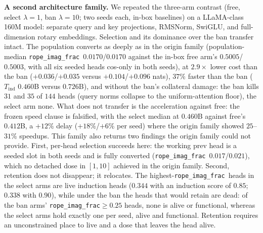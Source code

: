 \documentclass[11pt]{article}
\newcommand{\rif}{\texttt{rope\_imag\_frac}\xspace}
\begin{document}
\textbf{A second architecture family.} We repeated the three-arm contrast (free, select $\lambda{=}1$, ban
$\lambda{=}10$; two seeds each, in-box baselines) on a LLaMA-class 160M model: separate query and key
projections, RMSNorm, SwiGLU, and full-dimension rotary embeddings. Selection and its dominance over the ban
transfer intact. The population converts as deeply as in the origin family (population-median \rif\
$0.0170$/$0.0170$ against the in-box free arm's $0.5005$/$0.5003$, with all six seeded heads cos-only in both
seeds), at $2.9\times$ lower cost than the ban ($+0.036$/$+0.035$ versus $+0.104$/$+0.096$ nats), $37\%$ faster
than the ban ($T_{\mathrm{ind}}$ $0.460$B versus $0.726$B), and without the ban's collateral damage: the ban
kills $31$ and $35$ of $144$ heads (query norms collapse to the uniform-attention floor), the select arm none.
What does not transfer is the acceleration against free: the frozen speed clause is falsified, with the select
median at $0.460$B against free's $0.412$B, a $+12\%$ delay ($+18\%$/$+6\%$ per seed) where the origin family
showed $25$--$31\%$ speedups. This family also returns two findings the origin family could not provide. First,
per-head selection succeeds here: the working prev head is a seeded slot in both seeds and is fully converted
(\rif\ $0.017$/$0.021$), which no detached dose in $[1,10]$ achieved in the origin family. Second, retention does
not disappear; it relocates. The highest-\rif\ heads in the select arms are live induction heads ($0.344$ with an
induction score of $0.85$; $0.338$ with $0.90$), while under the ban the heads that would retain are dead: of the
ban arms' \rif${\ge}0.25$ heads, none is alive or functional, whereas the select arms hold exactly one per seed,
alive and functional. Retention requires an unconstrained place to live and a dose that leaves the head alive.
\end{document}

